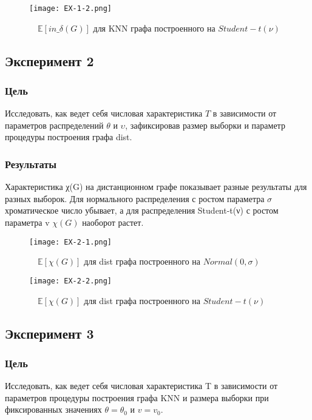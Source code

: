\documentclass[a4paper, 12pt]{article}
\begin{document}
\begin{figure}[H]
    \centering
    \texttt{[image: EX-1-2.png]}
    \caption{$\quad \mathbb{E}[in\_\delta(G)]$ для KNN графа построенного на $Student-t(ν)$}
    \label{fig:uml}
\end{figure}


\subsection{Эксперимент 2}
\subsubsection{Цель}
Исследовать, как ведет себя числовая характеристика $T$ в зависимости
от параметров распределений $θ$ и $υ$, зафиксировав размер выборки и
параметр процедуры построения графа dist.\\

\subsubsection{Результаты}

Характеристика χ(G) на дистанционном графе показывает разные результаты для разных выборок. Для нормального распределения с ростом параметра $\sigma$ хроматическое число убывает, а для распределения Student-t(ν) с ростом параметра v $\chi(G)$ наоборот растет.\\

\begin{figure}[H]
    \centering
    \texttt{[image: EX-2-1.png]}
    \caption{$\quad \mathbb{E}[\chi(G)]$ для dist графа построенного на $Normal(0,\sigma)$}
    \label{fig:uml}
\end{figure}

\begin{figure}[H]
    \centering
    \texttt{[image: EX-2-2.png]}
    \caption{$\quad \mathbb{E}[\chi(G)]$ для dist графа построенного на $Student-t(ν)$}
    \label{fig:uml}
\end{figure}


\subsection{Эксперимент 3}
\subsubsection{Цель}
Исследовать, как ведет себя числовая характеристика T в зависимости
от параметров процедуры построения графа KNN и размера выборки при
фиксированных значениях $\theta = \theta_0$ и $v = v_0$.\\
\end{document}
